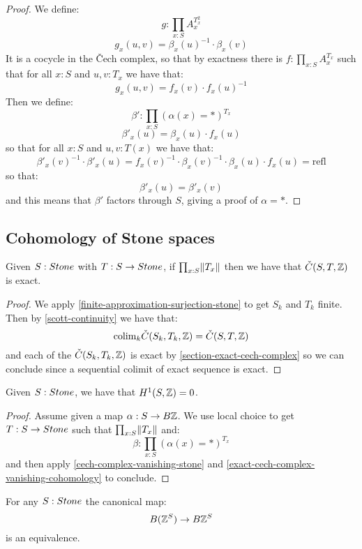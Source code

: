 \begin{proof}
We define:
\[g : \prod_{x:S} A_x^{T_x^2}\]
\[g_x(u,v) = \beta_x(u)^{-1}\cdot\beta_x(v)\] 
It is a cocycle in the \v{C}ech complex, so that by exactness there is $f:\prod_{x:S}A_x^{T_x}$ such that for all $x:S$ and $u,v:T_x$ we have that:
\[g_x(u,v)=f_x(v)\cdot f_x(u)^{-1}\]
Then we define:
\[\beta' : \prod_{x:S}(\alpha(x)=*)^{T_x}\]
\[\beta'_x(u) = \beta_x(u)\cdot f_x(u)\]
so that for all $x:S$ and $u,v:T(x)$ we have that:
\[\beta'_x(v)^{-1}\cdot\beta'_x(u) = f_x(v)^{-1}\cdot\beta_x(v)^{-1}\cdot\beta_x(u)\cdot f_x(u) = \mathrm{refl}\]
so that:
\[\beta'_x(u)=\beta'_x(v)\]
and this means that $\beta'$ factors through $S$, giving a proof of $\alpha = *$.
\end{proof}


\subsection{Cohomology of Stone spaces}

\begin{lemma}\label{cech-complex-vanishing-stone}
Given $S:\Stone$ with $T:S\to\Stone$, if $\prod_{x:S}\lVert T_x \rVert$ then we have that $\check{C}(S,T,\mathbb{Z})$ is exact.
\end{lemma}

\begin{proof}
We apply \cref{finite-approximation-surjection-stone} to get $S_k$ and $T_k$ finite. Then by \cref{scott-continuity} we have that:
\[\mathrm{colim}_k \check{C}(S_k,T_k,\mathbb{Z}) = \check{C}(S,T,\mathbb{Z})\]
and each of the $\check{C}(S_k,T_k,\mathbb{Z})$ is exact by \cref{section-exact-cech-complex} so we can conclude since a sequential colimit of exact sequence is exact.
\end{proof}

\begin{lemma}\label{eilenberg-stone-vanish}
Given $S:\Stone$, we have that $H^1(S,\mathbb{Z}) = 0$. 
\end{lemma}

\begin{proof}
Assume given a map $\alpha:S\to B\mathbb{Z}$. We use local choice to get $T:S\to\Stone$ such that $\prod_{x:S}\lVert T_x \rVert$ and:
\[\beta:\prod_{x:S}(\alpha(x)=*)^{T_x}\]
and then apply \cref{cech-complex-vanishing-stone} and \cref{exact-cech-complex-vanishing-cohomology} to conclude.
\end{proof}

\begin{corollary}\label{stone-commute-delooping}
For any $S:\Stone$ the canonical map:
\[B(\mathbb{Z}^S) \to B\mathbb{Z}^S\]
is an equivalence.
\end{corollary}


